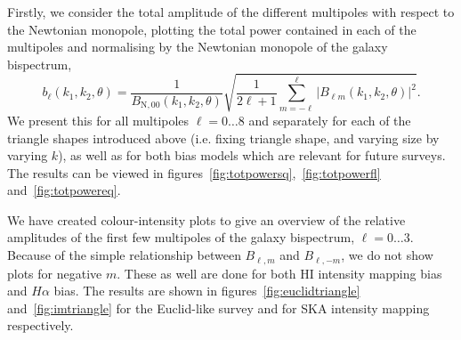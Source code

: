 {Firstly, we consider the total amplitude of the different multipoles with respect to the Newtonian monopole, plotting the total power contained in each of the multipoles and normalising by the Newtonian monopole of the galaxy bispectrum, 
\begin{equation}\label{eq:totpower}
b_\ell(k_1,k_2,\theta) = \frac{1}{ B_{\mathrm{N},00}(k_1,k_2,\theta)}{\sqrt{\frac{1}{2 \ell + 1} \displaystyle\sum_{m=-\ell}^\ell |B_{\ell m}(k_1,k_2,\theta)|^2}}. 
\end{equation}
We present this for all multipoles \(\ell = 0 \ldots 8\) and separately for each of the triangle shapes introduced above (i.e. fixing triangle shape, and varying size by varying \(k\)), as well as for both bias models which are relevant for future surveys. The results can be viewed in figures~\ref{fig:totpowersq},~\ref{fig:totpowerfl} and~\ref{fig:totpowereq}.

We have created colour-intensity plots to give an overview of the relative amplitudes of the first few multipoles of the galaxy bispectrum, \(\ell = 0 \ldots 3\). Because of the simple relationship between \(B_{\ell,m}\) and \(B_{\ell, -m}\), we do not show plots for negative \(m\). These as well are done for both HI intensity mapping bias and \(H\alpha\) bias. The results are shown in figures~\ref{fig:euclidtriangle} and~\ref{fig:imtriangle} for the Euclid-like survey and for SKA intensity mapping respectively. 

}
